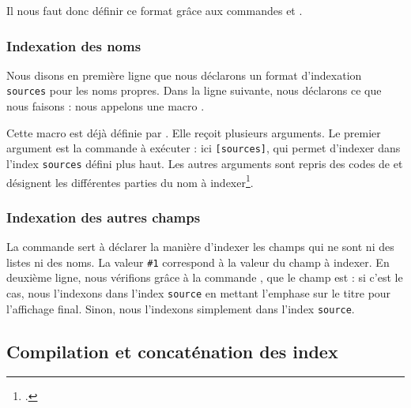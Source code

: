 Il nous faut donc définir ce format grâce aux commandes  et .

\subsubsection{Indexation des noms}

\begin{english}
\begin{latexcode}
\end{latexcode}
\end{english}

Nous disons en première ligne que nous déclarons un format d'indexation \verb|sources| pour les noms propres. Dans la ligne suivante, nous déclarons ce que nous faisons : nous appelons une macro . 

Cette macro est déjà définie par . Elle reçoit plusieurs arguments. Le premier argument est la commande à exécuter : ici \verb|[sources]|, qui permet d'indexer dans l'index \verb|sources| défini plus haut. Les autres arguments sont repris des codes de  et désignent les différentes parties du nom à indexer\footcite[Nous renvoyons le lecteur à la documentation de  : ][]{biblatex_formats}.


\subsubsection{Indexation des autres champs}

\begin{latexcode}
\end{latexcode}

La commande  sert à déclarer la manière d'indexer les champs qui ne sont ni des listes ni des noms. La valeur \verb|#1| correspond à la valeur du champ à indexer. En deuxième ligne, nous vérifions grâce à la commande , que le champ    est  : si c'est le cas, nous l'indexons dans l'index \verb|source| en mettant l'emphase sur le titre pour l'affichage final. Sinon, nous l'indexons simplement dans l'index \verb|source|.

\subsection{Compilation et concaténation des index}


